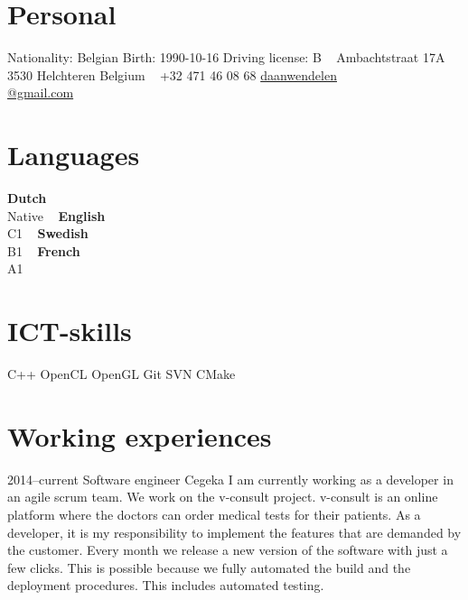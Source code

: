 \documentclass[]{friggeri-cv} %
\begin{document}


\begin{aside} %
\section{Personal}
Nationality: Belgian
Birth: 1990-10-16
Driving license: B
~
Ambachtstraat 17A
3530 Helchteren
Belgium
~
+32 471 46 08 68
\href{mailto:daanwendelen@gmail.com}{daanwendelen\\@gmail.com}
\section{Languages}
\textbf{Dutch}\\Native
~
\textbf{English}\\C1
~
\textbf{Swedish}\\B1
~
\textbf{French}\\A1
\section{ICT-skills}
C++
OpenCL
OpenGL
Git
SVN
CMake
\end{aside}

\section{Working experiences}
\begin{entrylist}
\entry
{2014--current}
{Software engineer}
{Cegeka}
{I am currently working as a developer in an agile scrum team. We work on the v-consult project. v-consult is an online platform where the doctors can order medical tests for their patients.
As a developer, it is my responsibility to implement the features that are demanded by the customer. Every month we release a new version of the software with just a few clicks.
This is possible because we fully automated the build and the deployment procedures. This includes automated testing.}
\end{entrylist}
\end{document}
